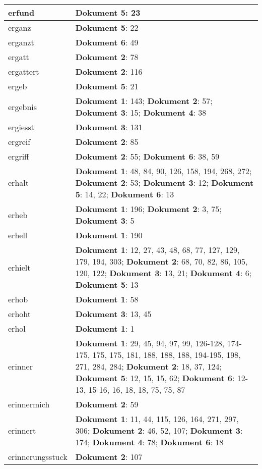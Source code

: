 \documentclass[a5paper]{article}
\begin{document}
\begin{longtable}[l]{|l|p{3in}|}
\hline
erfund & \textbf{Dokument 5}: 23 \\
\hline
erganz & \textbf{Dokument 5}: 22 \\
\hline
erganzt & \textbf{Dokument 6}: 49 \\
\hline
ergatt & \textbf{Dokument 2}: 78 \\
\hline
ergattert & \textbf{Dokument 2}: 116 \\
\hline
ergeb & \textbf{Dokument 5}: 21 \\
\hline
ergebnis & \textbf{Dokument 1}: 143; \textbf{Dokument 2}: 57; \textbf{Dokument 3}: 15; \textbf{Dokument 4}: 38 \\
\hline
ergiesst & \textbf{Dokument 3}: 131 \\
\hline
ergreif & \textbf{Dokument 2}: 85 \\
\hline
ergriff & \textbf{Dokument 2}: 55; \textbf{Dokument 6}: 38, 59 \\
\hline
erhalt & \textbf{Dokument 1}: 48, 84, 90, 126, 158, 194, 268, 272; \textbf{Dokument 2}: 53; \textbf{Dokument 3}: 12; \textbf{Dokument 5}: 14, 22; \textbf{Dokument 6}: 13 \\
\hline
erheb & \textbf{Dokument 1}: 196; \textbf{Dokument 2}: 3, 75; \textbf{Dokument 3}: 5 \\
\hline
erhell & \textbf{Dokument 1}: 190 \\
\hline
erhielt & \textbf{Dokument 1}: 12, 27, 43, 48, 68, 77, 127, 129, 179, 194, 303; \textbf{Dokument 2}: 68, 70, 82, 86, 105, 120, 122; \textbf{Dokument 3}: 13, 21; \textbf{Dokument 4}: 6; \textbf{Dokument 5}: 13 \\
\hline
erhob & \textbf{Dokument 1}: 58 \\
\hline
erhoht & \textbf{Dokument 3}: 13, 45 \\
\hline
erhol & \textbf{Dokument 1}: 1 \\
\hline
erinner & \textbf{Dokument 1}: 29, 45, 94, 97, 99, 126-128, 174-175, 175, 175, 181, 188, 188, 188, 194-195, 198, 271, 284, 284; \textbf{Dokument 2}: 18, 37, 124; \textbf{Dokument 5}: 12, 15, 15, 62; \textbf{Dokument 6}: 12-13, 15-16, 16, 18, 18, 75, 75, 87 \\
\hline
erinnermich & \textbf{Dokument 2}: 59 \\
\hline
erinnert & \textbf{Dokument 1}: 11, 44, 115, 126, 164, 271, 297, 306; \textbf{Dokument 2}: 46, 52, 107; \textbf{Dokument 3}: 174; \textbf{Dokument 4}: 78; \textbf{Dokument 6}: 18 \\
\hline
erinnerungsstuck & \textbf{Dokument 2}: 107 \\

\end{longtable}
\end{document}
